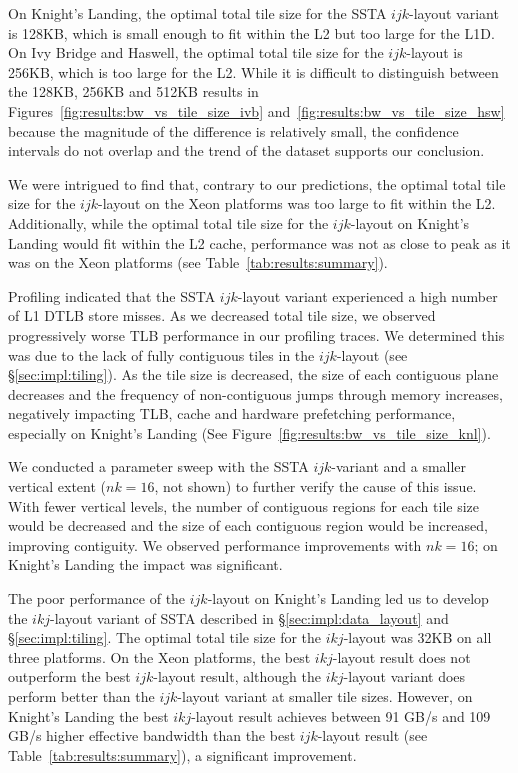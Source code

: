 \documentclass[10pt, conference, compsocconf]{IEEEtran}
\begin{document}
On Knight's Landing, the optimal total tile size for the SSTA \(ijk\)-layout
  variant is 128KB, which is small enough to fit within the L2 but too large
  for the L1D. 
On Ivy Bridge and Haswell, the optimal total tile size for the \(ijk\)-layout 
  is 256KB, which is too large for the L2.
While it is difficult to distinguish between the 128KB, 256KB and 512KB results
  in Figures~\ref{fig:results:bw_vs_tile_size_ivb} and~\ref{fig:results:bw_vs_tile_size_hsw}
  because the magnitude of the difference is relatively small, the confidence
  intervals do not overlap and the trend of the dataset supports our conclusion.

We were intrigued to find that, contrary to our predictions, the optimal total
  tile size for the \(ijk\)-layout on the Xeon platforms was too large to fit
  within the L2.
Additionally, while the optimal total tile size for the \(ijk\)-layout on
  Knight's Landing would fit within the L2 cache, performance was not as close to
  peak as it was on the Xeon platforms (see Table~\ref{tab:results:summary}).

Profiling indicated that the SSTA \(ijk\)-layout variant experienced a high
  number of L1 DTLB store misses.
As we decreased total tile size, we observed progressively worse TLB performance
  in our profiling traces.
We determined this was due to the lack of fully contiguous tiles in the
  \(ijk\)-layout (see \S\ref{sec:impl:tiling}). 
As the tile size is decreased, the size of each contiguous
  plane decreases and the frequency of non-contiguous jumps through memory
  increases, negatively impacting TLB, cache and hardware prefetching performance,
  especially on Knight's Landing (See
  Figure~\ref{fig:results:bw_vs_tile_size_knl}).

We conducted a parameter sweep with the SSTA \(ijk\)-variant and a smaller
  vertical extent (\(nk = 16\), not shown) to further verify the cause of this
  issue.
With fewer vertical levels, the number of contiguous regions for each tile size
  would be decreased and the size of each contiguous region would be increased,
  improving contiguity.
We observed performance improvements with \(nk = 16\); on Knight's Landing
  the impact was significant.

The poor performance of the \(ijk\)-layout on Knight's Landing led us to
  develop the \(ikj\)-layout variant of SSTA described in
  \S\ref{sec:impl:data_layout} and \S\ref{sec:impl:tiling}.
The optimal total tile size for the \(ikj\)-layout was 32KB on all three
  platforms.
On the Xeon platforms, the best \(ikj\)-layout result does not outperform the
  best \(ijk\)-layout result, although the \(ikj\)-layout variant does perform
  better than the \(ijk\)-layout variant at smaller tile sizes.
However, on Knight's Landing the best \(ikj\)-layout result achieves
  between 91 GB/s and 109 GB/s higher effective bandwidth than the best
  \(ijk\)-layout result (see Table~\ref{tab:results:summary}), a significant
  improvement.
\end{document}
